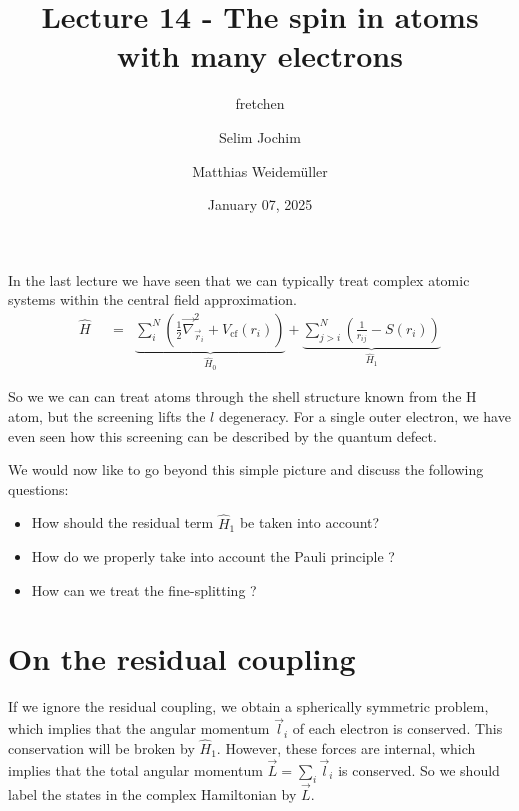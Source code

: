 \documentclass[10pt]{article}
\let\cite\citep
\providecommand\citep{\cite}
\newcommand*\ch[1]{\ensuremath{\mathrm{#1}}}
\begin{document}
\title{Lecture 14 - The spin in atoms with many electrons}



\author[1]{fretchen}%
\author[2]{Selim Jochim}%
\author[2]{Matthias Weidemüller}%
%
%


\vspace{-1em}



  
  \date{January 07, 2025}


\begingroup
\let\center\flushleft
\let\endcenter\endflushleft
\maketitle
\endgroup








\sloppy


In the last lecture \cite{electrons} we have seen that we can typically treat complex atomic systems within the central field approximation. 
\begin{align} \label{eq:lsvsjjhamiltonian}
\hat{H} &&=& \underbrace{\sum_i^N \left( \frac{1}{2} \vec{\nabla}^2_{\vec{r}_i} + V_\textrm{cf} (r_i) \right)}_{\hat{H}_0} + \underbrace{\sum^N_{j>i} \left( \frac{1}{r_{ij}} - S(r_i) \right)}_{\hat{H}_1}
\end{align}

So we we can can treat atoms through the shell structure known from the \ch{H} atom, but the screening lifts the $l$ degeneracy. For a single outer electron, we have even seen how this screening can be described by the quantum defect.

We would now like to go beyond this simple picture and discuss the following questions:
\begin{itemize}
\item How should the residual term $\hat{H}_1$ be taken into account?
\item How do we properly take into account the Pauli principle ?
\item How can we treat the fine-splitting ?
\end{itemize}

\section{On the residual coupling}
If we ignore the residual coupling, we obtain a spherically symmetric problem, which implies that the angular momentum $\vec{l}_i$ of each electron is conserved. This conservation will be broken by $\hat{H}_{1}$. However, these forces are internal, which implies that the total angular momentum $\vec{L} = \sum_i \vec{l}_i$ is conserved. So we should label the states in the complex Hamiltonian by $\vec{L}$.
\end{document}
